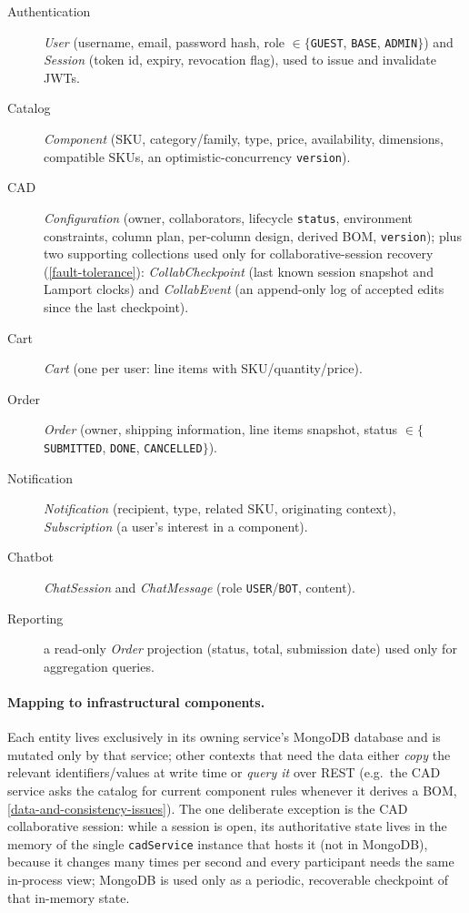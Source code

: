 \begin{description}
  \item[Authentication] \emph{User} (username, email, password hash, role
  $\in\{$\texttt{GUEST}, \texttt{BASE}, \texttt{ADMIN}$\}$) and \emph{Session}
  (token id, expiry, revocation flag), used to issue and invalidate JWTs.

  \item[Catalog] \emph{Component} (SKU, category/family, type, price,
  availability, dimensions, compatible SKUs, an optimistic-concurrency
  \texttt{version}).

  \item[CAD] \emph{Configuration} (owner, collaborators, lifecycle
  \texttt{status}, environment constraints, column plan, per-column design,
  derived BOM, \texttt{version}); plus two supporting collections used only for
  collaborative-session recovery (\cref{fault-tolerance}): \emph{CollabCheckpoint}
  (last known session snapshot and Lamport clocks) and \emph{CollabEvent} (an
  append-only log of accepted edits since the last checkpoint).

  \item[Cart] \emph{Cart} (one per user: line items with SKU/quantity/price).

  \item[Order] \emph{Order} (owner, shipping information, line items snapshot,
  status $\in\{$\texttt{SUBMITTED}, \texttt{DONE}, \texttt{CANCELLED}$\}$).

  \item[Notification] \emph{Notification} (recipient, type, related SKU,
  originating context), \emph{Subscription} (a user's interest in a
  component). 

  \item[Chatbot] \emph{ChatSession} and \emph{ChatMessage} (role
  \texttt{USER}/\texttt{BOT}, content).

  \item[Reporting] a read-only \emph{Order} projection (status, total,
  submission date) used only for aggregation queries.

\end{description}

\paragraph{Mapping to infrastructural components.} Each entity lives
exclusively in its owning service's MongoDB database and is mutated only by
that service; other contexts that need the data either \emph{copy} the
relevant identifiers/values at write time or \emph{query it} over REST
(e.g.\ the CAD service asks the catalog for current component rules whenever
it derives a BOM, \cref{data-and-consistency-issues}). The one deliberate
exception is the CAD collaborative session: while a session is open, its
authoritative state lives in the memory of the single \texttt{cadService}
instance that hosts it (not in MongoDB), because it changes many times per
second and every participant needs the same in-process view; MongoDB is used
only as a periodic, recoverable checkpoint of that in-memory state.

